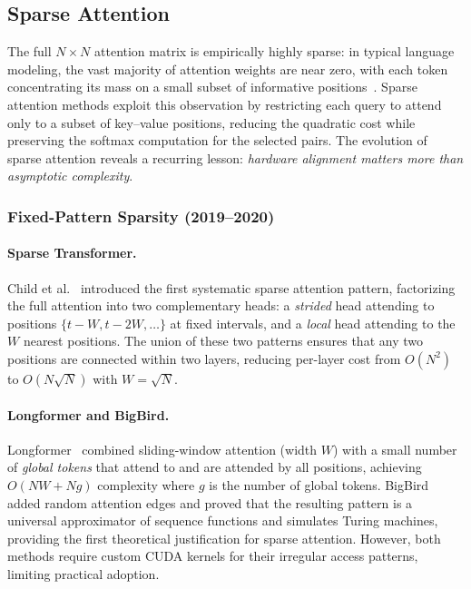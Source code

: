 \documentclass[11pt,a4paper]{article}
\begin{document}
\subsection{Sparse Attention}
\label{subsec:sparse}
The full $N \times N$ attention matrix is empirically highly sparse: in typical language modeling, the vast majority of attention weights are near zero, with each token concentrating its mass on a small subset of informative positions~\cite{child2019generating}. Sparse attention methods exploit this observation by restricting each query to attend only to a subset of key--value positions, reducing the quadratic cost while preserving the softmax computation for the selected pairs. The evolution of sparse attention reveals a recurring lesson: \emph{hardware alignment matters more than asymptotic complexity}.

\subsubsection{Fixed-Pattern Sparsity (2019--2020)}

\paragraph{Sparse Transformer.}
Child et al.~\cite{child2019generating} introduced the first systematic sparse attention pattern, factorizing the full attention into two complementary heads: a \emph{strided} head attending to positions $\{t - W, t - 2W, \ldots\}$ at fixed intervals, and a \emph{local} head attending to the $W$ nearest positions. The union of these two patterns ensures that any two positions are connected within two layers, reducing per-layer cost from $O(N^2)$ to $O(N\sqrt{N})$ with $W = \sqrt{N}$.

\paragraph{Longformer and BigBird.}
Longformer~\cite{beltagy2020longformer} combined sliding-window attention (width $W$) with a small number of \emph{global tokens} that attend to and are attended by all positions, achieving $O(NW + Ng)$ complexity where $g$ is the number of global tokens. BigBird~\cite{zaheer2020bigbird} added random attention edges and proved that the resulting pattern is a universal approximator of sequence functions and simulates Turing machines, providing the first theoretical justification for sparse attention. However, both methods require custom CUDA kernels for their irregular access patterns, limiting practical adoption.
\end{document}
